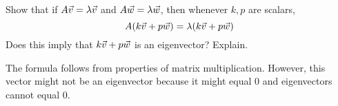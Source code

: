 \documentclass{ximera}
\begin{document}
\begin{exercise}
  Show that if $A\vec{v}=\lambda \vec{v}$ and
  $A\vec{w}=\lambda \vec{w}$, then whenever $k,p$ are scalars,
  \begin{equation*}
    A(k\vec{v}+p\vec{w}) =\lambda (k\vec{v}+p\vec{w})
  \end{equation*}
  Does this imply that $k\vec{v}+p\vec{w}$ is an eigenvector? Explain.
  \begin{solution}
    The formula follows from properties of matrix
    multiplication. However, this vector might not be an eigenvector
    because it might equal $0$ and eigenvectors cannot equal $0$.
  \end{solution}
\end{exercise}
\end{document}
